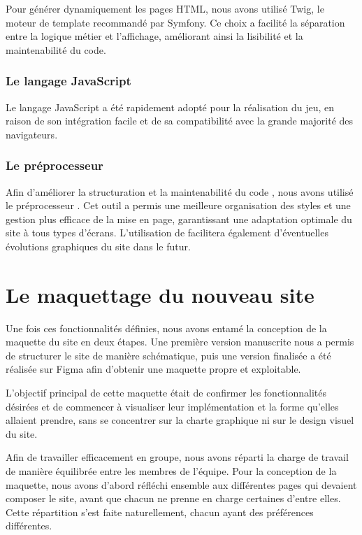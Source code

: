 Pour générer dynamiquement les pages HTML, nous avons utilisé Twig, le moteur de template recommandé par Symfony. Ce choix a facilité la séparation entre la logique métier et l'affichage, améliorant ainsi la lisibilité et la maintenabilité du code.

\subsubsection*{Le langage JavaScript}

Le langage JavaScript a été rapidement adopté pour la réalisation du jeu, en raison de son intégration facile et de sa compatibilité avec la grande majorité des navigateurs.

\subsubsection*{Le préprocesseur }

Afin d’améliorer la structuration et la maintenabilité du code , nous avons utilisé le préprocesseur . Cet outil a permis une meilleure organisation des styles et une gestion plus efficace de la mise en page, garantissant une adaptation optimale du site à tous types d’écrans. L’utilisation de  facilitera également d’éventuelles évolutions graphiques du site dans le futur.


\section{Le maquettage du nouveau site}

Une fois ces fonctionnalités définies, nous avons entamé la conception de la maquette du site en deux étapes. Une première version manuscrite nous a permis de structurer le site de manière schématique, puis une version finalisée a été réalisée sur Figma afin d’obtenir une maquette propre et exploitable.

L'objectif principal de cette maquette était de confirmer les fonctionnalités désirées et de commencer à visualiser leur implémentation et la forme qu'elles allaient prendre, sans se concentrer sur la charte graphique ni sur le design visuel du site.

Afin de travailler efficacement en groupe, nous avons réparti la charge de travail de manière équilibrée entre les membres de l'équipe. Pour la conception de la maquette, nous avons d'abord réfléchi ensemble aux différentes pages qui devaient composer le site, avant que chacun ne prenne en charge certaines d’entre elles. Cette répartition s’est faite naturellement, chacun ayant des préférences différentes.

